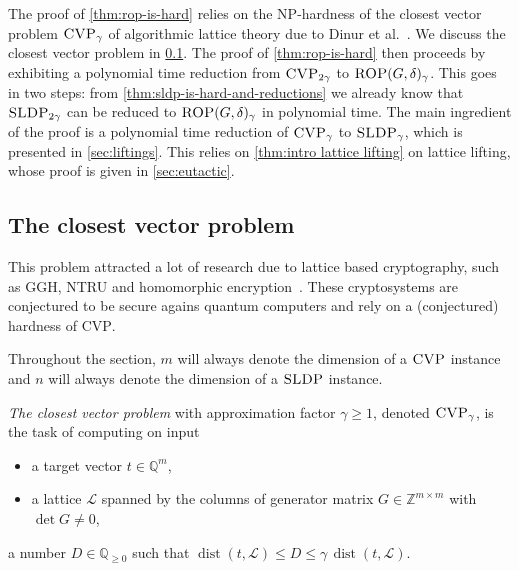 \documentclass[a4paper,USenglish,cleveref,numberwithinsect]{lipics-v2021}
\DeclareMathOperator{\dist}{dist}
\newcommand{\QQ}{\mathbb{Q}}
\newcommand{\ZZ}{\mathbb{Z}}
\numberwithin{equation}{section}
\begin{document}
The proof of \cref{thm:rop-is-hard} relies on the \textsc{NP}-hardness of
the closest vector problem $\textsc{CVP}_\gamma$
of algorithmic lattice theory due to Dinur et al.~\cite{dinurcvp}.
We discuss the closest vector problem in \cref{sec:sldp-to-cvp}.
The proof of \cref{thm:rop-is-hard} then proceeds by
exhibiting a polynomial time reduction from
$\textsc{CVP}_{2\gamma}$ to $\textsc{ROP}(G,\delta)_{\gamma}$.
This goes in two steps: from \cref{thm:sldp-is-hard-and-reductions}
we already know that
$\textsc{SLDP}_{2\gamma}$ can be reduced to $\textsc{ROP}(G,\delta)_\gamma$
in polynomial time.
The main ingredient of the proof is a polynomial time reduction of
$\textsc{CVP}_\gamma$ to $\textsc{SLDP}_\gamma$,
which is presented in \cref{sec:liftings}.
This relies on \cref{thm:intro lattice lifting}
on lattice lifting, whose proof is given in \cref{sec:eutactic}.


\subsection{The closest vector problem}\label{sec:sldp-to-cvp}
This problem attracted a lot of research due to lattice based cryptography, such as GGH, NTRU and
homomorphic encryption~\cite{ggh-crypto, ntru-crytpo-1, ntru-crypto-2, homomorphic-crypto}.
These cryptosystems are conjectured to be secure agains quantum computers and rely on a (conjectured) hardness of \textsc{CVP}.

Throughout the section, $m$ will always denote the dimension of a $\textsc{CVP}$ instance and $n$ will always denote the dimension of a $\textsc{SLDP}$ instance.

\begin{definition}
\label{def:gapcvp}
{\em The closest vector problem} with approximation factor $\gamma\geq1$,
denoted $\textsc{CVP}_\gamma$,
is the task of computing on input
\begin{itemize}
\item a target vector $t\in\QQ^m$,
\item a lattice $\mathcal{L}$ spanned by the columns of generator matrix $G\in\ZZ^{m\times m}$
 with $\det G\neq 0$,
\end{itemize}
a number $D\in\QQ_{\geq 0}$
such that
$\dist(t,\mathcal{L}) \leq  D \leq \gamma \, \dist( t , \mathcal{L} )$.
\end{definition}
\end{document}
